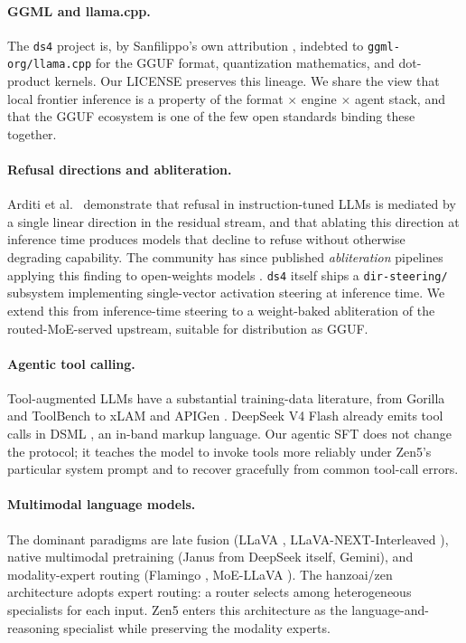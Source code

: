 \documentclass[11pt,a4paper]{article}
\begin{document}
\paragraph{GGML and llama.cpp.} The \texttt{ds4} project is, by Sanfilippo's own attribution
\cite{antirez-ds4}, indebted to \texttt{ggml-org/llama.cpp} \cite{llamacpp} for the GGUF format,
quantization mathematics, and dot-product kernels. Our LICENSE preserves this lineage. We share the
view that local frontier inference is a property of the format $\times$ engine $\times$ agent stack,
and that the GGUF ecosystem is one of the few open standards binding these together.

\paragraph{Refusal directions and abliteration.} Arditi et al.\ \cite{arditi2024refusal} demonstrate
that refusal in instruction-tuned LLMs is mediated by a single linear direction in the residual stream,
and that ablating this direction at inference time produces models that decline to refuse without
otherwise degrading capability. The community has since published \emph{abliteration} pipelines
applying this finding to open-weights models \cite{failspy-abliterate}. \texttt{ds4} itself ships a
\texttt{dir-steering/} subsystem implementing single-vector activation steering at inference time. We
extend this from inference-time steering to a weight-baked abliteration of the routed-MoE-served
upstream, suitable for distribution as GGUF.

\paragraph{Agentic tool calling.} Tool-augmented LLMs have a substantial training-data literature, from
Gorilla \cite{gorilla} and ToolBench \cite{toolbench} to xLAM \cite{xlam} and APIGen \cite{apigen}.
DeepSeek V4 Flash already emits tool calls in DSML \cite{dsml}, an in-band markup language. Our
agentic SFT does not change the protocol; it teaches the model to invoke tools more reliably under
Zen5's particular system prompt and to recover gracefully from common tool-call errors.

\paragraph{Multimodal language models.} The dominant paradigms are late fusion (LLaVA \cite{llava},
LLaVA-NEXT-Interleaved \cite{llavanext}), native multimodal pretraining (Janus
\cite{janus} from DeepSeek itself, Gemini), and modality-expert routing (Flamingo
\cite{flamingo}, MoE-LLaVA \cite{moellava}). The hanzoai/zen architecture \cite{hanzoai-zen} adopts
expert routing: a router selects among heterogeneous specialists for each input. Zen5 enters this
architecture as the language-and-reasoning specialist while preserving the modality experts.
\end{document}
